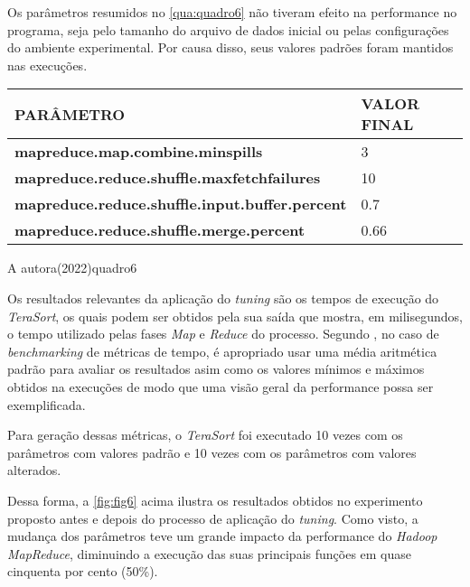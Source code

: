 \newpage
Os parâmetros resumidos no \autoref{qua:quadro6} não tiveram efeito na performance no programa, seja pelo tamanho do arquivo de dados inicial ou pelas configurações do ambiente experimental. Por causa disso, seus valores padrões foram mantidos nas execuções.

{\footnotesize
  \centering
  \begin{tabular}{|p{75mm}|p{25mm}|}\hline
    \textbf{PARÂMETRO}                                     & \textbf{VALOR FINAL} \\\hline
    \textbf{mapreduce.map.combine.minspills}               & 3                    \\\hline
    \textbf{mapreduce.reduce.shuffle.maxfetchfailures}     & 10                   \\\hline
    \textbf{mapreduce.reduce.shuffle.input.buffer.percent} & 0.7                  \\\hline
    \textbf{mapreduce.reduce.shuffle.merge.percent}        & 0.66                 \\\hline
  \end{tabular}}
{A autora(2022)}{quadro6}{}{}

Os resultados relevantes da aplicação do \textit{\gls{tuning}} são os tempos de execução do \textit{TeraSort}, os quais podem ser obtidos pela sua saída que mostra, em milisegundos, o tempo utilizado pelas fases \textit{Map} e \textit{Reduce} do processo. Segundo \textcite{Fleming86}, no caso de \textit{\gls{benchmark}ing} de métricas de tempo, é apropriado usar uma média aritmética padrão para avaliar os resultados asim como os valores mínimos e máximos obtidos na execuções de modo que uma visão geral da performance possa ser exemplificada.

Para geração dessas métricas, o \textit{TeraSort} foi executado 10 vezes com os parâmetros com valores padrão e 10 vezes com os parâmetros com valores alterados.

\newpage
Dessa forma, a \autoref{fig:fig6} acima ilustra os resultados obtidos no experimento proposto antes e depois do processo de aplicação do \textit{\gls{tuning}}. Como visto, a mudança dos parâmetros teve um grande impacto da performance do \textit{Hadoop MapReduce}, diminuindo a execução das suas principais funções em quase cinquenta por cento (50\%). 
